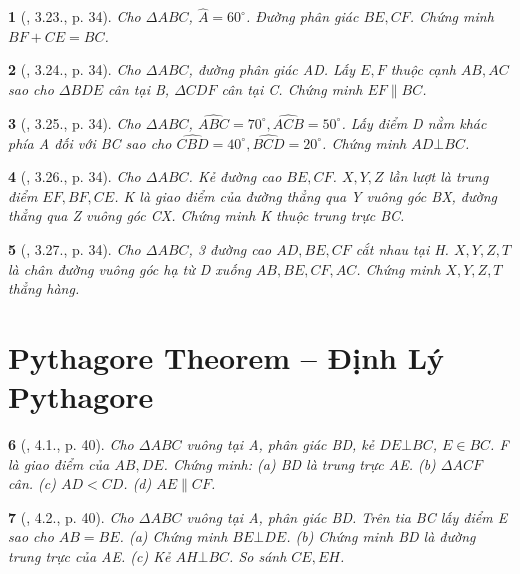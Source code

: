\documentclass{article}
\newtheorem{baitoan}{}
\begin{document}
\begin{baitoan}[\cite{Hung_Mai_Toan_7_hinh_hoc}, 3.23., p. 34]
	Cho $\Delta ABC$, $\widehat{A} = 60^\circ$. Đường phân giác $BE,CF$. Chứng minh $BF + CE = BC$.
\end{baitoan}

\begin{baitoan}[\cite{Hung_Mai_Toan_7_hinh_hoc}, 3.24., p. 34]
	Cho $\Delta ABC$, đường phân giác AD. Lấy $E,F$ thuộc cạnh $AB,AC$ sao cho $\Delta BDE$ cân tại B, $\Delta CDF$ cân tại C. Chứng minh $EF\parallel BC$.
\end{baitoan}

\begin{baitoan}[\cite{Hung_Mai_Toan_7_hinh_hoc}, 3.25., p. 34]
	Cho $\Delta ABC$, $\widehat{ABC} = 70^\circ,\widehat{ACB} = 50^\circ$. Lấy điểm D nằm khác phía A đối với BC sao cho $\widehat{CBD} = 40^\circ,\widehat{BCD} = 20^\circ$. Chứng minh $AD\bot BC$.
\end{baitoan}

\begin{baitoan}[\cite{Hung_Mai_Toan_7_hinh_hoc}, 3.26., p. 34]
	Cho $\Delta ABC$. Kẻ đường cao $BE,CF$. $X,Y,Z$ lần lượt là trung điểm $EF,BF,CE$. K là giao điểm của đường thẳng qua Y vuông góc BX, đường thẳng qua Z vuông góc CX. Chứng minh K thuộc trung trực BC.
\end{baitoan}

\begin{baitoan}[\cite{Hung_Mai_Toan_7_hinh_hoc}, 3.27., p. 34]
	Cho $\Delta ABC$, 3 đường cao $AD,BE,CF$ cắt nhau tại H. $X,Y,Z,T$ là chân đường vuông góc hạ từ D xuống $AB,BE,CF,AC$. Chứng minh $X,Y,Z,T$ thẳng hàng.
\end{baitoan}


\section{Pythagore Theorem -- Định Lý Pythagore}

\begin{baitoan}[\cite{Hung_Mai_Toan_7_hinh_hoc}, 4.1., p. 40]
	Cho $\Delta ABC$ vuông tại A, phân giác BD, kẻ $DE\bot BC$, $E\in BC$. F là giao điểm của $AB,DE$. Chứng minh: (a) BD là trung trực AE. (b) $\Delta ACF$ cân. (c) $AD < CD$. (d) $AE\parallel CF$.
\end{baitoan}

\begin{baitoan}[\cite{Hung_Mai_Toan_7_hinh_hoc}, 4.2., p. 40]
	Cho $\Delta ABC$ vuông tại A, phân giác BD. Trên tia BC lấy điểm E sao cho $AB = BE$. (a) Chứng minh $BE\bot DE$. (b) Chứng minh BD là đường trung trực của AE. (c) Kẻ $AH\bot BC$. So sánh $CE,EH$.
\end{baitoan}
\end{document}

